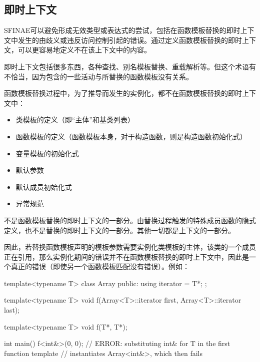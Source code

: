 \subsection{即时上下文}

SFINAE可以避免形成无效类型或表达式的尝试，包括在函数模板替换的即时上下文中发生的由歧义或违反访问控制引起的错误。通过定义函数模板替换的即时上下文，可以更容易地定义不在该上下文中的内容。

\begin{notice}
即时上下文包括很多东西，各种查找、别名模板替换、重载解析等。但这个术语有不恰当，因为包含的一些活动与所替换的函数模板没有关系。
\end{notice}

函数模板替换过程中，为了推导而发生的实例化，都不在函数模板替换的即时上下文中：

\begin{itemize}
\item 
类模板的定义（即“主体”和基类列表）

\item 
函数模板的定义（函数模板本身，对于构造函数，则是构造函数初始化式）

\item 
变量模板的初始化式

\item 
默认参数

\item 
默认成员初始化式

\item 
异常规范
\end{itemize}

不是函数模板替换的即时上下文的一部分。由替换过程触发的特殊成员函数的隐式定义，也不是替换的即时上下文的一部分。其他一切都是上下文的一部分。

因此，若替换函数模板声明的模板参数需要实例化类模板的主体，该类的一个成员正在引用，那么实例化期间的错误并不在函数模板替换的即时上下文中，因此是一个真正的错误（即使另一个函数模板匹配没有错误）。例如：

\begin{cpp}
template<typename T>
class Array {
	public:
	using iterator = T*;
};

template<typename T>
void f(Array<T>::iterator first, Array<T>::iterator last);

template<typename T>
void f(T*, T*);

int main() {
	f<int&>(0, 0); // ERROR: substituting int& for T in the first function template
} // instantiates Array<int&>, which then fails
\end{cpp}


